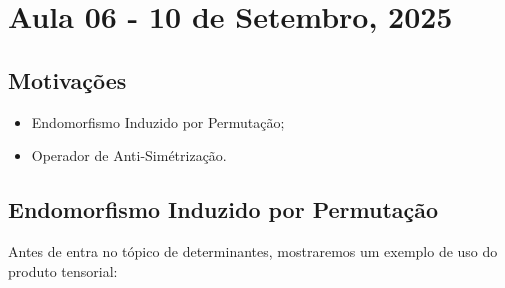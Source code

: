 \documentclass[../differential_forms.tex]{subfiles}
\begin{document}
\section{Aula 06 - 10 de Setembro, 2025}
\subsection{Motivações}
\begin{itemize}
	\item Endomorfismo Induzido por Permutação;
	\item Operador de Anti-Simétrização.
\end{itemize}
\subsection{Endomorfismo Induzido por Permutação}
Antes de entra no tópico de determinantes, mostraremos um exemplo de uso do produto tensorial:
\end{document}
